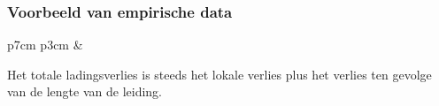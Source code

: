 \documentclass[t]{beamer}
\begin{document}
  	\begin{frame}
		\frametitle{Voorbeeld van empirische data}
		\center
		\begin{tabular}{p{7cm} p{3cm}}
			&
		\end{tabular}
		
		\center
		Het totale ladingsverlies is steeds het lokale verlies plus het verlies ten gevolge van de lengte van de leiding.
	
	\end{frame}
\end{document}
